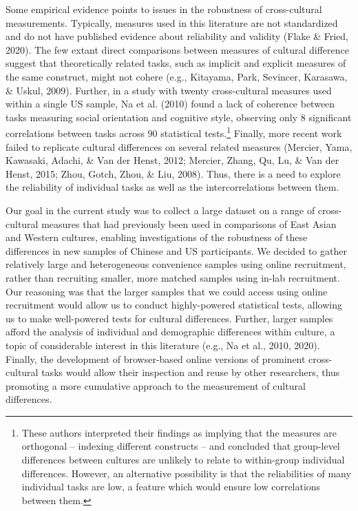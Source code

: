 \documentclass[
  man,floatsintext]{apa6}
\begin{document}
Some empirical evidence points to issues in the robustness of cross-cultural measurements. Typically, measures used in this literature are not standardized and do not have published evidence about reliability and validity (Flake \& Fried, 2020). The few extant direct comparisons between measures of cultural difference suggest that theoretically related tasks, such as implicit and explicit measures of the same construct, might not cohere (e.g., Kitayama, Park, Sevincer, Karasawa, \& Uskul, 2009). Further, in a study with twenty cross-cultural measures used within a single US sample, Na et al. (2010) found a lack of coherence between tasks measuring social orientation and cognitive style, observing only 8 significant correlations between tasks across 90 statistical tests.\footnote{These authors interpreted their findings as implying that the measures are orthogonal -- indexing different constructs -- and concluded that group-level differences between cultures are unlikely to relate to within-group individual differences. However, an alternative possibility is that the reliabilities of many individual tasks are low, a feature which would ensure low correlations between them.} Finally, more recent work failed to replicate cultural differences on several related measures (Mercier, Yama, Kawasaki, Adachi, \& Van der Henst, 2012; Mercier, Zhang, Qu, Lu, \& Van der Henst, 2015; Zhou, Gotch, Zhou, \& Liu, 2008). Thus, there is a need to explore the reliability of individual tasks as well as the intercorrelations between them.

Our goal in the current study was to collect a large dataset on a range of cross-cultural measures that had previously been used in comparisons of East Asian and Western cultures, enabling investigations of the robustness of these differences in new samples of Chinese and US participants. We decided to gather relatively large and heterogeneous convenience samples using online recruitment, rather than recruiting smaller, more matched samples using in-lab recruitment. Our reasoning was that the larger samples that we could access using online recruitment would allow us to conduct highly-powered statistical tests, allowing us to make well-powered tests for cultural differences. Further, larger samples afford the analysis of individual and demographic differences within culture, a topic of considerable interest in this literature (e.g., Na et al., 2010, 2020). Finally, the development of browser-based online versions of prominent cross-cultural tasks would allow their inspection and reuse by other researchers, thus promoting a more cumulative approach to the measurement of cultural differences.
\end{document}
